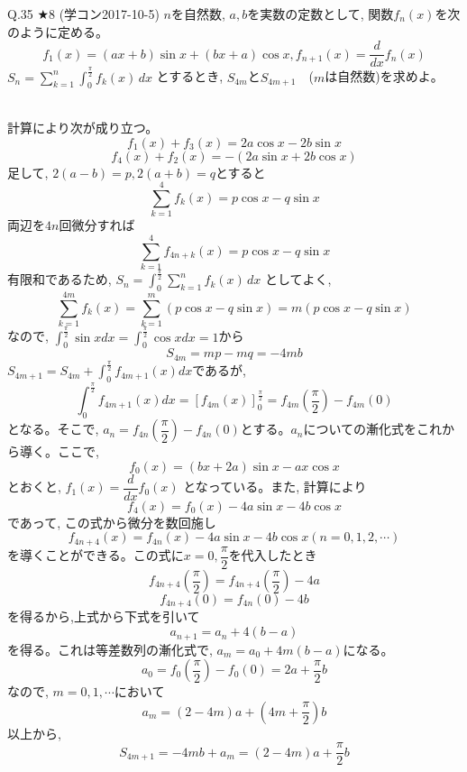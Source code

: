 \documentclass[twocolumn]{jsarticle}
\newcommand{\thm}{\begin{itembox}[l]}
\newcommand{\disp}{\displaystyle}
\newcommand{\enthm}{\end{itembox}\\}
\begin{document}
\thm{Q.35 $\bigstar 8$ (学コン2017-10-5)}
$n$を自然数, $a,b$を実数の定数として, 関数$f_n(x)$を次のように定める。
\[f_1(x)=(ax+b)\sin{x}+(bx+a)\cos{x},　f_{n+1}(x)=\dfrac{d}{dx}f_n(x)\]
$S_n=\disp\sum_{k=1}^n\disp\int_0^{\frac{\pi}{2}}f_k(x)\, dx$ とするとき, $S_{4m}$と$S_{4m+1}$　($m$は自然数)を求めよ。
\enthm
計算により次が成り立つ。
\[ f_1(x)+f_3(x)=2a\cos{x}-2b\sin{x}\]
\[ f_4(x) +f_2(x)=-(2a\sin{x}+2b\cos{x})\]
足して, $2(a-b)=p, 2(a+b)=q$とすると
\[\disp\sum_{k=1}^4f_k(x) = p\cos{x}-q\sin{x}\]
両辺を$4n$回微分すれば
\[\disp\sum_{k=1}^4f_{4n+k}(x) = p\cos{x}-q\sin{x}\]
有限和であるため, $S_n =\disp\int_0^{\frac{\pi}{2}} \disp\sum_{k=1}^nf_k(x)\, dx$ としてよく,
\[\disp\sum_{k=1}^{4m}f_k(x) = \disp\sum_{k=1}^{m}(p\cos{x}-q\sin{x})=m(p\cos{x}-q\sin{x})\]
なので, $\disp\int_0^{\frac{\pi}{2}}\sin{x}dx=\disp\int_0^{\frac{\pi}{2}}\cos{x}dx=1$から
\[S_{4m}=mp-mq=-4mb\]
$S_{4m+1}=S_{4m}+\disp\int_{0}^{\frac{\pi}{2}}f_{4m+1}(x)dx$であるが,
\[\disp\int_{0}^{\frac{\pi}{2}}f_{4m+1}(x)dx=\left[ f_{4m}(x)\right]^{\frac{\pi}{2}}_0 = f_{4m}\left(\dfrac{\pi}{2}\right)-f_{4m}(0)\]
となる。そこで, $a_n=f_{4n}\left( \dfrac{\pi}{2}\right)-f_{4n}(0)$とする。$a_n$についての漸化式をこれから導く。ここで, 
\[f_0(x)=(bx+2a)\sin{x}-ax\cos{x}\]
とおくと, $f_1(x)=\dfrac{d}{dx}f_0(x)$ となっている。また, 計算により
\[f_4(x)=f_0(x)-4a\sin{x}-4b\cos{x}\]
であって, この式から微分を数回施し
\[f_{4n+4}(x)=f_{4n}(x) -4a\sin{x}-4b\cos{x}　(n=0,1,2,\cdots )\]
を導くことができる。この式に$x=0,\dfrac{\pi}{2}$を代入したとき
\[f_{4n+4}\left(\dfrac{\pi}{2}\right)=f_{4n+4}\left( \dfrac{\pi}{2}\right)-4a\]
\[f_{4n+4}(0)=f_{4n}(0)-4b\]
を得るから,上式から下式を引いて
\[a_{n+1}=a_n+4(b-a)\]
を得る。これは等差数列の漸化式で, $a_m=a_0+4m(b-a)$になる。
\[a_0=f_0\left(\dfrac{\pi}{2}\right)-f_0(0)=2a+\dfrac{\pi}{2}b\]
なので, $m=0,1,\cdots $において
\[a_m=(2-4m)a+\left(4m+\dfrac{\pi}{2}\right)b\]
以上から, 
\[S_{4m+1}=-4mb+a_m=(2-4m)a+\dfrac{\pi}{2}b\]
\end{document}
